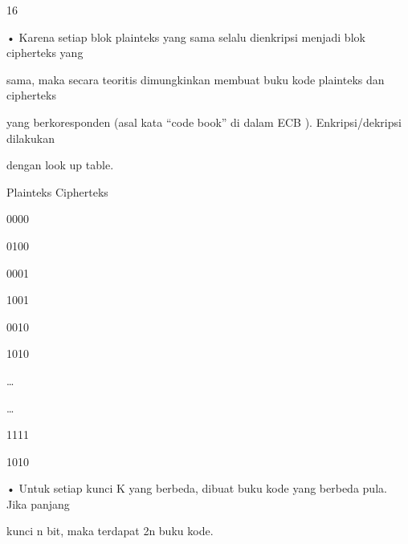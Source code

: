 \documentclass{article}
\begin{document}

16

• Karena setiap blok plainteks yang sama selalu dienkripsi menjadi blok cipherteks yang 

sama, maka secara teoritis dimungkinkan membuat buku kode plainteks dan cipherteks 

yang berkoresponden (asal kata “code book” di dalam ECB ). Enkripsi/dekripsi dilakukan 

dengan look up table. 

        Plainteks            Cipherteks


0000 


0100


0001 


1001 


0010 


1010


… 


…


1111 


1010 


• Untuk setiap kunci K yang berbeda, dibuat buku kode yang berbeda pula. Jika panjang 

kunci n bit, maka terdapat 2n buku kode.
\end{document}
